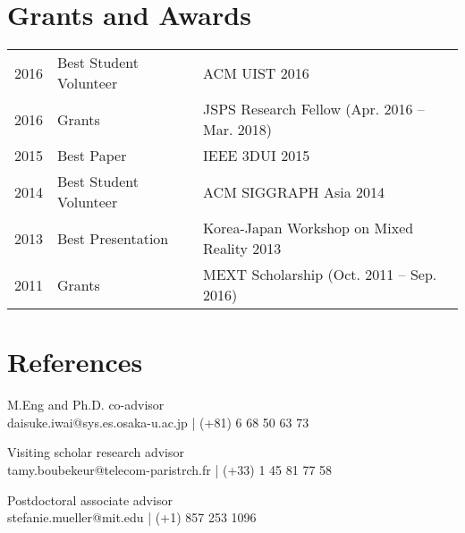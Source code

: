 \documentclass[]{resume-enhanced}
\begin{document}
\section{Grants and Awards} 
\begin{tabular}{rll}
2016	& Best Student Volunteer	& ACM UIST 2016 \\
2016	& Grants					& JSPS Research Fellow (Apr. 2016 -- Mar. 2018) \\
2015	& Best Paper				& IEEE 3DUI 2015 \\
2014	& Best Student Volunteer	& ACM SIGGRAPH Asia 2014 \\
2013	& Best Presentation			& Korea-Japan Workshop on Mixed Reality 2013 \\
2011	& Grants					& MEXT Scholarship (Oct. 2011 -- Sep. 2016)
\end{tabular}
\sectionsep




\section{References} 
M.Eng and Ph.D. co-advisor \\
daisuke.iwai@sys.es.osaka-u.ac.jp | (+81) 6 68 50 63 73 \\

\vspace{\topsep} %

Visiting scholar research advisor \\
tamy.boubekeur@telecom-paristrch.fr | (+33) 1 45 81 77 58 \\

\vspace{\topsep} %

Postdoctoral associate advisor \\
stefanie.mueller@mit.edu | (+1) 857 253 1096 \\

\sectionsep
\end{document}
